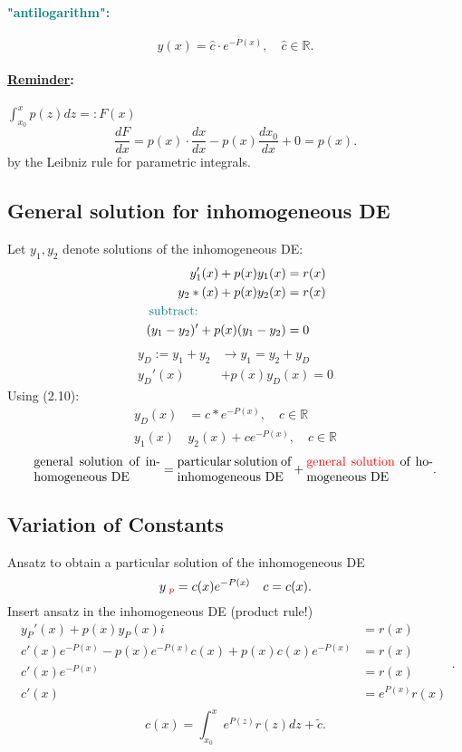 \documentclass[]{article}
\begin{document}
		\paragraph{ \textcolor{teal}{"antilogarithm":}} \[
			y(x)=\hat c \cdot e ^{-P(x)},\quad \hat c\in \mathbb R
		.\]
		\paragraph{ \underline{Reminder}:} $ \int_{x_0}^{x} p(z)dz =: F(x)$
		\[
		\frac{dF}{dx}=p(x) \cdot  \frac{dx}{dx}-p(x) \frac{dx_0}{dx}+0 =p(x)
		.\]
		by the Leibniz rule for parametric integrals.
\subsection{General solution for inhomogeneous DE}
Let $y_1,y_2$ denote solutions of the inhomogeneous DE:
\[
\begin{split}
	y_1'(x)+p(x)y_1(x) &=r(x)\\
	y_2*(x)+p(x)y_2(x) &=r(x)\\
	\text{ \textcolor{teal}{subtract:}}\quad\quad\quad\quad\quad\quad\quad& ~  \\
	(y_1-y_2)'+p(x)(y_1-y_2)&=0
\end{split}
\]
\[
\begin{split}
	y_D:=y_1+y_2 &\rightarrow y_1=y_2+y_D\\
	y_D'(x) &+p(x)y_D(x)=0
\end{split}
\]
Using (2.10):
\[
\begin{split}
	y_D(x) & =c*e ^{-P(x)},\quad c\in \mathbb R  \\
	y_1(x) & y_2(x)+c e ^{-P(x)},\quad c\in \mathbb R
\end{split}
\]
\[
	\parbox{10em}{general solution of inhomogeneous DE}=\parbox{9em}{particular solution of inhomogeneous DE}+\parbox{10em}{ \textcolor{red}{general solution} of homogeneous DE}
.\]
\subsection{Variation of Constants}
Ansatz to obtain a particular solution of the inhomogeneous DE
\[
	y_{ \text{ \textcolor{red}{$p$}}}=c(x) e ^{-P(x)}\quad c=c(x)
.\]
Insert ansatz in the inhomogeneous DE (product rule!)
\[
\begin{split}
	y_P'(x)+p(x)y_P(x)i &=r(x)\\
	c'(x)e ^{-P(x)}-p(x)e ^{-P(x)}c(x)+p(x)c(x)e ^{-P(x)} &= r(x)\\
	c'(x) e ^{-P(x)}&=r(x)\\
	c'(x)&=e ^{P(x)}r(x)\\
\end{split}
.\]
\[
	c(x)= \int_{x_0}^{x} e ^{P(z)}r(z) dz+\tilde c
.\]
\end{document}
